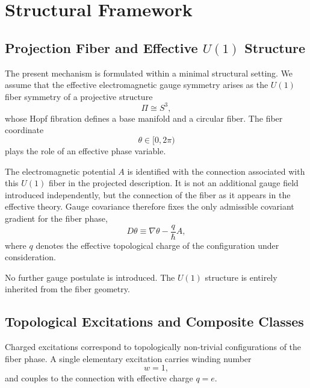 \section{Structural Framework}
  \label{sec:structural-framework}

  \subsection{Projection Fiber and Effective $U(1)$ Structure}
    \label{subsec:projection-fiber}

    The present mechanism is formulated within a minimal structural setting.
    We assume that the effective electromagnetic gauge symmetry arises as
    the $U(1)$ fiber symmetry of a projective structure
    \begin{equation}
      \Pi \cong S^3 ,
    \end{equation}
    whose Hopf fibration defines a base manifold and a circular fiber.
    The fiber coordinate
    \begin{equation}
      \theta \in [0,2\pi)
    \end{equation}
    plays the role of an effective phase variable.

    The electromagnetic potential $A$ is identified with the connection
    associated with this $U(1)$ fiber in the projected description.
    It is not an additional gauge field introduced independently,
    but the connection of the fiber as it appears in the effective theory.
    Gauge covariance therefore fixes the only admissible covariant gradient
    for the fiber phase,
    \begin{equation}
      D\theta \equiv \nabla \theta - \frac{q}{\hbar} A ,
      \label{eq:covariant-theta}
    \end{equation}
    where $q$ denotes the effective topological charge
    of the configuration under consideration.

    No further gauge postulate is introduced.
    The $U(1)$ structure is entirely inherited from the fiber geometry.

  \subsection{Topological Excitations and Composite Classes}
    \label{subsec:topological-excitations}

    Charged excitations correspond to topologically non-trivial
    configurations of the fiber phase.
    A single elementary excitation carries winding number
    \begin{equation}
      w = 1 ,
    \end{equation}
    and couples to the connection with effective charge $q=e$.

